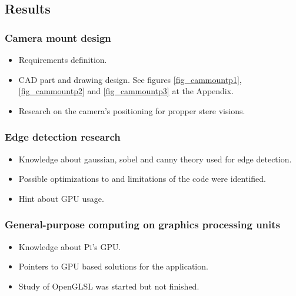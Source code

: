 \subsection{Results}


\subsubsection{Camera mount design}

\begin{itemize}
	\item Requirements definition.
	\item CAD part and drawing design. See figures \ref{fig_cammountp1}, \ref{fig_cammountp2} and \ref{fig_cammountp3} at the Appendix.
	\item Research on the camera's positioning for propper stere visions.
\end{itemize}


\subsubsection{Edge detection research}

\begin{itemize}
	\item Knowledge about gaussian, sobel and canny theory used for edge detection.
	\item Possible optimizations to and limitations of the code were identified.
	\item Hint about GPU usage.
\end{itemize}


\subsubsection{General-purpose computing on graphics processing units}

\begin{itemize}
	\item Knowledge about Pi's GPU.
	\item Pointers to GPU based solutions for the application.
	\item Study of OpenGLSL was started but not finished.
\end{itemize}

